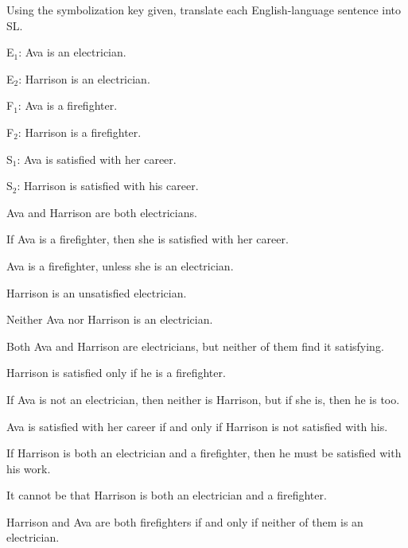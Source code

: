 


\noindent\problempart Using the symbolization key given, translate each English-language sentence into SL.
\label{pr.avacareer}
\begin{ekey}
\item[E$_1$:] Ava is an electrician.
\item[E$_2$:] Harrison is an electrician.
\item[F$_1$:] Ava is a firefighter.
\item[F$_2$:] Harrison is a firefighter.
\item[S$_1$:] Ava is satisfied with her career.
\item[S$_2$:] Harrison is satisfied with his career.
\end{ekey}
\begin{exercises}
\item Ava and Harrison are both electricians.  
\item If Ava is a firefighter, then she is satisfied with her career.   
\item Ava is a firefighter, unless she is an electrician.   
\item Harrison is an unsatisfied electrician.   
\item Neither Ava nor Harrison is an electrician.   
\item Both Ava and Harrison are electricians, but neither of them find it satisfying.  
\item Harrison is satisfied only if he is a firefighter.  
\item If Ava is not an electrician, then neither is Harrison, but if she is, then he is too.  
\item Ava is satisfied with her career if and only if Harrison is not satisfied with his.  
\item If Harrison is both an electrician and a firefighter, then he must be satisfied with his work.  
\item It cannot be that Harrison is both an electrician and a firefighter.  
\item Harrison and Ava are both firefighters if and only if neither of them is an electrician.  \vspace{1ex}
\end{exercises}

